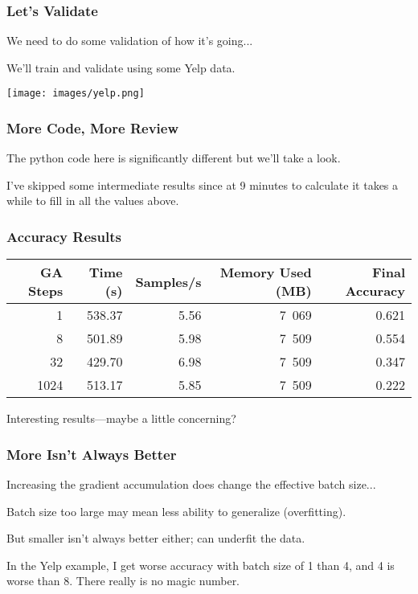 \begin{frame}
\frametitle{Let's Validate}

We need to do some validation of how it's going...


We'll train and validate using some Yelp data.

\begin{center}
	\texttt{[image: images/yelp.png]}
\end{center}

\end{frame}

\begin{frame}
\frametitle{More Code, More Review}

The python code here is significantly different but we'll take a look.

I've skipped some intermediate results since at 9 minutes to calculate it takes a while to fill in all the values above.


\end{frame}

\begin{frame}
\frametitle{Accuracy Results}

\begin{center}
\begin{tabular}{r|r|r|r|r}
\textbf{GA Steps} & \textbf{Time (s)} & \textbf{Samples/s} & \textbf{Memory Used (MB)} & \textbf{Final Accuracy}\\ \hline
1 & 538.37 & 5.56 & 7~069 & 0.621 \\
8 & 501.89 & 5.98 & 7~509 & 0.554 \\
32 & 429.70 & 6.98 & 7~509 & 0.347 \\
1024 & 513.17 & 5.85 & 7~509 & 0.222 \\
\end{tabular}
\end{center}

Interesting results---maybe a little concerning?

\end{frame}

\begin{frame}
\frametitle{More Isn't Always Better}

Increasing the gradient accumulation does change the effective batch size...

Batch size too large may mean less ability to generalize (overfitting).

But smaller isn't always better either; can underfit the data.

In the Yelp example, I get worse accuracy with batch size of 1 than 4, and 4 is worse than 8. There really is no magic number.


\end{frame}

